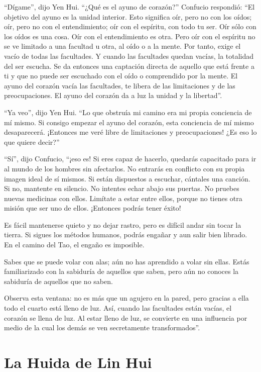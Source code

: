 \documentclass[hidelinks]{memoir}
\begin{document}
	``Dígame'', dijo Yen Hui. ``¿Qué es el ayuno de corazón?'' Confucio
	respondió: ``El objetivo del ayuno es la unidad interior. Esto significa
	oír, pero no con los oídos; oír, pero no con el entendimiento; oír con
	el espíritu, con todo tu ser. Oír sólo con los oídos es una cosa. Oír
	con el entendimiento es otra. Pero oír con el espíritu no se ve limitado
	a una facultad u otra, al oído o a la mente. Por tanto, exige el vacío
	de todas las facultades. Y cuando las facultades quedan vacías, la
	totalidad del ser escucha. Se da entonces una captación directa de
	aquello que está frente a ti y que no puede ser escuchado con el oído o
	comprendido por la mente. El ayuno del corazón vacía las facultades, te
	libera de las limitaciones y de las preocupaciones. El ayuno del corazón
	da a luz la unidad y la libertad''.
	
	``Ya veo'', dijo Yen Hui. ``Lo que obstruía mi camino era mi propia
	conciencia de mí mismo. Si consigo empezar el ayuno del corazón, esta
	conciencia de mí mismo desaparecerá. ¡Entonces me veré libre de
	limitaciones y preocupaciones! ¿Es eso lo que quiere decir?''
	
	``Sí'', dijo Confucio, ``¡eso es! Si eres capaz de hacerlo, quedarás
	capacitado para ir al mundo de los hombres sin afectarlos. No entrarás
	en conflicto con su propia imagen ideal de sí mismos. Si están
	dispuestos a escuchar, cántales una canción. Si no, mantente en
	silencio. No intentes echar abajo sus puertas. No pruebes nuevas
	medicinas con ellos. Limítate a estar entre ellos, porque no tienes otra
	misión que ser uno de ellos. ¡Entonces podrás tener éxito!
	
	Es fácil mantenerse quieto y no dejar rastro, pero es difícil andar sin
	tocar la tierra. Si sigues los métodos humanos, podrás engañar y aun
	salir bien librado. En el camino del Tao, el engaño es imposible.
	
	Sabes que se puede volar con alas; aún no has aprendido a volar sin
	ellas. Estás familiarizado con la sabiduría de aquellos que saben, pero
	aún no conoces la sabiduría de aquellos que no saben.
	
	Observa esta ventana: no es más que un agujero en la pared, pero gracias
	a ella todo el cuarto está lleno de luz. Así, cuando las facultades
	están vacías, el corazón se llena de luz. Al estar lleno de luz, se
	convierte en una influencia por medio de la cual los demás se ven
	secretamente transformados''.
	
	\chapter*{La Huida de Lin Hui}
	
\end{document}

